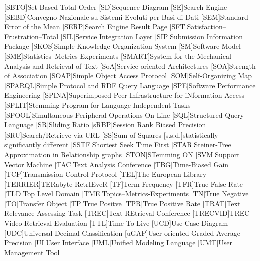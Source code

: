 [SBTO]{Set-Based Total Order}
[SD]{Sequence Diagram}
[SE]{Search Engine}
[SEBD]{Convegno Nazionale su Sistemi Evoluti per Basi di Dati}
[SEM]{Standard Error of the Mean}
[SERP]{Search Engine Result Page}
[SFT]{Satisfaction--Frustration--Total}
[SIL]{Service Integration Layer}
[SIP]{Submission Information Package}
[SKOS]{Simple Knowledge Organization System}
[SM]{Software Model}
[SME]{Statistics--Metrics-Experiments}
[SMART]{System for the Mechanical Analysis and Retrieval of Text}
[SoA]{Service-oriented Architectures}
[SOA]{Strength of Association}
[SOAP]{Simple Object Access Protocol}
[SOM]{Self-Organizing Map}
[SPARQL]{Simple Protocol and RDF Query Language}
[SPE]{Software Performance Engineering}
[SPINA]{Superimposed Peer Infrastructure for iNformation Access}
[SPLIT]{Stemming Program for Language Independent Tasks}
[SPOOL]{Simultaneous Peripheral Operations On Line}
[SQL]{Structured Query Language}
[SR]{Sliding Ratio}
[sRBP]{Session Rank Biased Precision}
[SRU]{Search/Retrieve via \acs{URL}}
[SS]{Sum of Squares}
[s.s.d.]{statistically significantly different}
[SSTF]{Shortest Seek Time First}
[STAR]{Steiner-Tree Approximation in Relationship graphs}
[STON]{STemming ON}
[SVM]{Support Vector Machine}
[TAC]{Text Analysis Conference}
[TBG]{Time-Biased Gain}
[TCP]{Transmission Control Protocol}
[TEL]{The European Library}
[TERRIER]{TERabyte RetrIEveR}
[TF]{Term Frequency}
[TFR]{True False Rate}
[TLD]{Top Level Domain}
[TME]{Topics--Metrics-Experiments}
[TN]{True Negative}
[TO]{Transfer Object}
[TP]{True Positve}
[TPR]{True Positive Rate}
[TRAT]{Text Relevance Assessing Task}
[TREC]{Text REtrieval Conference}
[TRECVID]{TREC Video Retrieval Evaluation}
[TTL]{Time-To-Live}
[UCD]{Use Case Diagram}
[UDC]{Universal Decimal Classification}
[uGAP]{User-oriented Graded Average Precision}
[UI]{User Interface}
[UML]{Unified Modeling Language}
[UMT]{User Management Tool}
